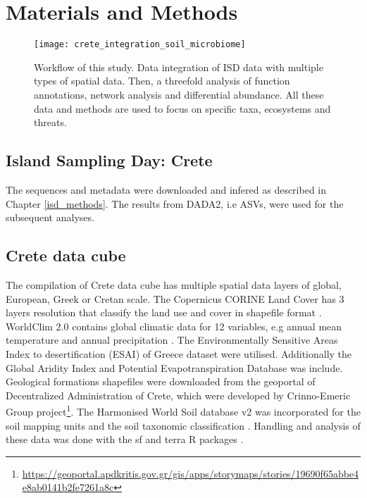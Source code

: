 \section{Materials and Methods}\label{integration_methods}

\begin{figure}[t] 
    \centering\texttt{[image: crete\_integration\_soil\_microbiome]}
    \caption{Workflow of this study. Data integration of ISD data with multiple types of spatial data. Then, a threefold analysis of function annotations, network analysis and differential abundance. All these data and methods are used to focus on specific taxa, ecosystems and threats.}
    \label{fig:workflow}
\end{figure}

\subsection{Island Sampling Day: Crete}\label{isd_data}
The sequences and metadata were downloaded and infered as described in Chapter \ref{isd_methods}.
The results from DADA2, i.e ASVs, were used for the subsequent analyses.

\subsection{Crete data cube}\label{spatial_data}

The compilation of Crete data cube has multiple spatial data layers of global,
European, Greek or Cretan scale. 
The Copernicus CORINE Land Cover has 3 layers resolution that classify the land
use and cover in shapefile format \parencite{CLC2023}. 
WorldClim 2.0 contains global climatic data for 12 variables, e.g annual mean
temperature and annual precipitation \parencite{Fick2017}.
The Environmentally Sensitive Areas Index to desertification (ESAI) 
of Greece dataset \parencite{KARAMESOUTI2018266} were utilised. Additionally the 
Global Aridity Index and Potential Evapotranspiration Database \parencite{zomer2022version} was include.
Geological formations shapefiles were downloaded from the geoportal of
Decentralized Administration of Crete, which were developed by
Crinno-Emeric Group project\footnote{\url{https://geoportal.apdkritis.gov.gr/gis/apps/storymaps/stories/19690f65abbe4e8ab0141b2fe7261a8c}}.
The Harmonised World Soil database v2 was incorporated for the soil mapping units and 
the soil taxonomic classification \parencite{fao2023}.
Handling and analysis of these data was done with the sf and terra R packages \parencite{Pebesma2023}.

